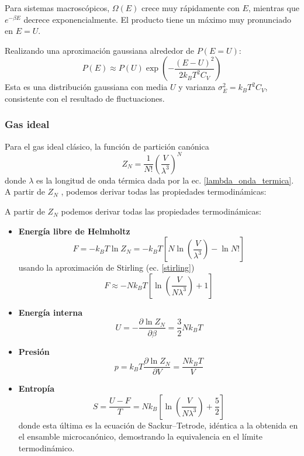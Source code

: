 \documentclass[]{article}
\numberwithin{equation}{section}
\newcommand{\0}{\textcolor{gray}{0}}
\newcommand{\pd}[2]{\dfrac{\partial #1}{\partial #2}}
\begin{document}
Para sistemas macroscópicos, \(\Omega(E)\) crece muy rápidamente con \(E\), mientras que \(e^{-\beta E}\) decrece exponencialmente. El producto tiene un máximo muy pronunciado en \(E = U\).

Realizando una aproximación gaussiana alrededor de \(P(E = U)\):
\begin{equation}
	P(E) \approx P(U) \exp\left(-\frac{(E - U)^2}{2 k_B T^2 C_V}\right)
\end{equation}
Esta es una distribución gaussiana con media \(U\) y varianza \(\sigma_E^2 = k_B T^2 C_V\), consistente con el resultado de fluctuaciones.

\subsubsection{Gas ideal}
Para el gas ideal clásico, la función de partición canónica
\begin{equation}
	Z_N = \dfrac{1}{N!}\left(\dfrac{V}{\lambda^3}\right)^N \label{particion_canonica_gas_ideal}
\end{equation}
donde \(\lambda\) es la longitud de onda térmica dada por la ec. \ref{lambda_onda_termica}. A partir de \( Z_N\) , podemos derivar todas las propiedades termodinámicas:

A partir de \(Z_N\) podemos derivar todas las propiedades termodinámicas:
\begin{itemize}
	\item \textbf{Energía libre de Helmholtz}
	\begin{equation*}
		F = -k_B T \ln Z_N = -k_B T \left[N\ln\left(\dfrac{V}{\lambda^3}\right) - \ln N!\right]
	\end{equation*}
	usando la aproximación de Stirling (ec. \ref{stirling})
	\begin{equation}
		F \approx -N k_B T \left[\ln\left(\dfrac{V}{N\lambda^3}\right) + 1\right]
	\end{equation}
	\item \textbf{Energía interna}
	\begin{equation}
		U = - \pd{\ln Z_N}{\beta} = \frac{3}{2} N k_B T
	\end{equation}
	\item \textbf{Presión}
	\begin{equation}
	p = k_B T \pd{\ln Z_N}{V} = \frac{ N k_B T}{V}
	\end{equation}
	\item \textbf{Entropía}
	\begin{equation}
	S = \frac{U - F}{T} = N k_B \left[\ln\left(\frac{V}{N \lambda^3}\right) + \frac{5}{2}\right]
	\end{equation}
	donde esta última es la ecuación de Sackur–Tetrode, idéntica a la obtenida en el ensamble microcanónico, demostrando la equivalencia en el límite termodinámico.
\end{itemize}
\end{document}
